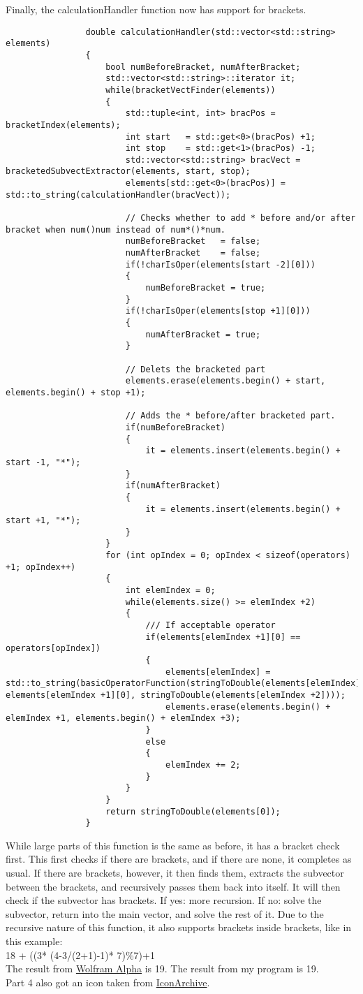 \documentclass{article}
\begin{document}
			Finally, the calculationHandler function now has support for brackets.
			\begin{lstlisting}
				double calculationHandler(std::vector<std::string> elements)
				{
					bool numBeforeBracket, numAfterBracket;
					std::vector<std::string>::iterator it;
					while(bracketVectFinder(elements))
					{
						std::tuple<int, int> bracPos = bracketIndex(elements);
						int start   = std::get<0>(bracPos) +1;
						int stop    = std::get<1>(bracPos) -1;
						std::vector<std::string> bracVect = bracketedSubvectExtractor(elements, start, stop);
						elements[std::get<0>(bracPos)] = std::to_string(calculationHandler(bracVect));
						
						// Checks whether to add * before and/or after bracket when num()num instead of num*()*num.
						numBeforeBracket   = false;
						numAfterBracket    = false;
						if(!charIsOper(elements[start -2][0]))
						{
							numBeforeBracket = true;
						}
						if(!charIsOper(elements[stop +1][0]))
						{
							numAfterBracket = true;
						}
						
						// Delets the bracketed part
						elements.erase(elements.begin() + start, elements.begin() + stop +1);
						
						// Adds the * before/after bracketed part.
						if(numBeforeBracket)
						{
							it = elements.insert(elements.begin() + start -1, "*");
						}
						if(numAfterBracket)
						{
							it = elements.insert(elements.begin() + start +1, "*");
						}
					}
					for (int opIndex = 0; opIndex < sizeof(operators) +1; opIndex++)
					{
						int elemIndex = 0;
						while(elements.size() >= elemIndex +2)
						{
							/// If acceptable operator
							if(elements[elemIndex +1][0] == operators[opIndex])
							{
								elements[elemIndex] = std::to_string(basicOperatorFunction(stringToDouble(elements[elemIndex]), elements[elemIndex +1][0], stringToDouble(elements[elemIndex +2])));
								elements.erase(elements.begin() + elemIndex +1, elements.begin() + elemIndex +3);
							}
							else
							{
								elemIndex += 2;
							}
						}
					}
					return stringToDouble(elements[0]);
				}
			\end{lstlisting}
			While large parts of this function is the same as before, it has a bracket check first. This first checks if there are brackets, and if there are none, it completes as usual. If there are brackets, however, it then finds them, extracts the subvector between the brackets, and recursively passes them back into itself. It will then check if the subvector has brackets. If yes: more recursion. If no: solve the subvector, return into the main vector, and solve the rest of it. Due to the recursive nature of this function, it also supports brackets inside brackets, like in this example: \\
			18 + ((3* (4-3/(2+1)-1)* 7)\%7)+1 \\
			The result from
			\href{http://www.wolframalpha.com/input/?i=18+\%2B+((3*+(4-3\%2F(2\%2B1)-1)*+7)\%257)\%2B1}{Wolfram Alpha}
			is 19. The result from my program is 19. \\
			Part 4 also got an icon taken from
			\href{http://www.iconarchive.com/show/sevenesque-icons-by-tristan-edwards/Calculator-icon.html}{IconArchive}.
		
\end{document}
